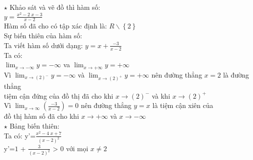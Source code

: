 \documentclass[17pt]{extarticle}
\begin{document}
\everymath{\displaystyle}
$\star$ Khảo sát và vẽ đồ thì hàm số: \\
$y=\frac{x^{2} - 2 \; x - 3}{x - 2}$\\
 Hàm số đã cho có tập xác định là: $R\backslash\left\{2\right\}$\\
 Sự biến thiên của hàm số:\\
	Ta viết hàm số dưới dạng: $y=x+\frac{-3}{x - 2}$\\
 Ta có: \\
$\lim_{x\to -\infty }y=-\infty$ va $\lim_{x\to+\infty }y=+\infty$\\
 Vì $\lim_{x\to(2)^{-} }y=-\infty$ và $\lim_{x\to(2)^{+} }y=+\infty$ nên đường thẳng $x=2$ là đường thẳng\\
tiệm cận đứng của đồ thị đã cho khi $x\to(2)^{-}$ và khi $x\to(2)^{+}$\\
 Vì $\lim_{x\to\infty}(\frac{-3}{x - 2})=0$ nên đường thẳng $y=x$ là tiệm cận xiên của\\
 đồ thị hàm số đã cho khi $x\to+\infty$ và $x\to-\infty$\\
$\star$ Bảng biến thiên:\\
 Ta có: y'=$\frac{x^{2} - 4 \; x + 7}{\left(x - 2\right)^{2}}$ \\
	y'=$1$ + $\frac{3}{\left(x - 2\right)^{2}}$ > 0 với mọi $x \neq 2$ \\
\end{document}
